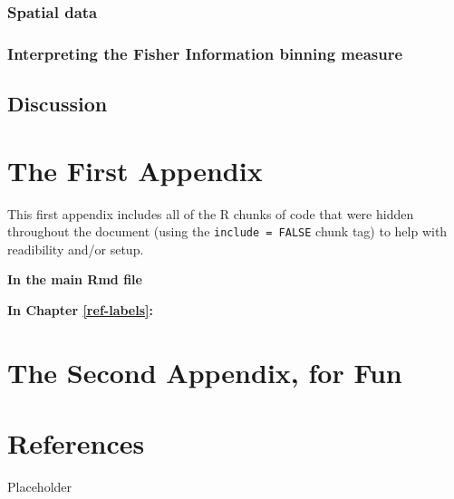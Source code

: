 \documentclass[12pt,twoside]{reedthesis}
\begin{document}
\subsection{Spatial data}\label{spatial-data}

\subsection{Interpreting the Fisher Information binning
measure}\label{interpreting-the-fisher-information-binning-measure}

\section{Discussion}\label{discussion-1}

\appendix

\chapter{The First Appendix}\label{the-first-appendix}

This first appendix includes all of the R chunks of code that were
hidden throughout the document (using the \texttt{include\ =\ FALSE}
chunk tag) to help with readibility and/or setup.

\textbf{In the main Rmd file}

\textbf{In Chapter \ref{ref-labels}:}

\chapter{The Second Appendix, for
Fun}\label{the-second-appendix-for-fun}

\chapter*{References}\label{references}

Placeholder


\end{document}
